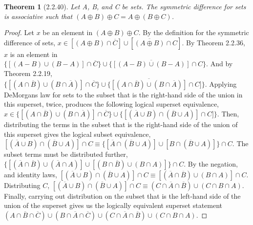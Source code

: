 \documentclass[a4paper, 12pt]{article}
\theoremstyle{plain}
\newtheorem*{theorem*}{Theorem}
\begin{document}
	
	\begin{theorem*}[2.2.40]
		Let A, B, and C be sets. The symmetric difference for sets is associative such that 
		$(A \oplus B) \oplus C = A \oplus (B \oplus C)$.
	\end{theorem*}

	\begin{proof}
		Let $x$ be an element in $(A \oplus B) \oplus C$. By the definition for the symmetric 
		difference of sets,
		$x \in [(A \oplus B) \cap \overline{C}] \cup [\overline{(A \oplus B)} \cap C]$. 
		By Theorem 2.2.36, $x$ is an element in 
		$\{[(A - B) \cup (B - A)] \cap \overline{C}\} \cup 
		\{\overline{[(A - B) \cup (B - A)]} \cap C\}$. 
		And by Theorem 2.2.19,
		$\{[(A \cap \overline{B}) \cup (B \cap \overline{A})] \cap \overline{C}\} \cup 
		\{\overline{[(A \cap \overline{B}) \cup (B \cap \overline{A})]} \cap C]\}$. 
		Applying DeMorgans law for sets to the subset that is the right-hand side of the union 
		in this superset, twice, produces the following logical superset equivalence,
		$x \in \{[(A \cap \overline{B}) \cup (B \cap \overline{A})] \cap \overline{C}\} \cup 
		\{[(\overline{A} \cup B) \cap (\overline{B} \cup A)] \cap C]\}$.
		Then, distributing the terms in the subset that is the right-hand side of the union of 
		this superset gives the logical subset equivalence,
		$[(\overline{A} \cup B) \cap (\overline{B} \cup A)] \cap C \equiv 
		\{[\overline{A} \cap (\overline{B} \cup A)] \cup [B \cap (\overline{B} \cup A)]\} \cap C$. 
		The subset terms must be distributed further,
		$\{[(\overline{A} \cap \overline{B}) \cup (\overline{A} \cap A)] \cup 
		[(B \cap \overline{B}) \cup (B \cap A)]\} \cap C$.
		By the negation, and identity laws,
		$[(\overline{A} \cup B) \cap (\overline{B} \cup A)] \cap C \equiv 
		[(\overline{A} \cap \overline{B}) \cup (B \cap A)] \cap C$. Distributing $C$, 
		$[(\overline{A} \cup B) \cap (\overline{B} \cup A)] \cap C \equiv 
		(C \cap \overline{A} \cap \overline{B}) \cup (C \cap B \cap A)$.
		Finally, carrying out distribution on the subset that is the left-hand side of the union 
		of the superset gives us the logically equivalent superset statement \newline
		$(A \cap \overline{B} \cap \overline{C}) \cup (B \cap \overline{A} \cap \overline{C}) \cup 
		(C \cap \overline{A} \cap \overline{B}) \cup (C \cap B \cap A)$.
		

\end{proof}
\end{document}
